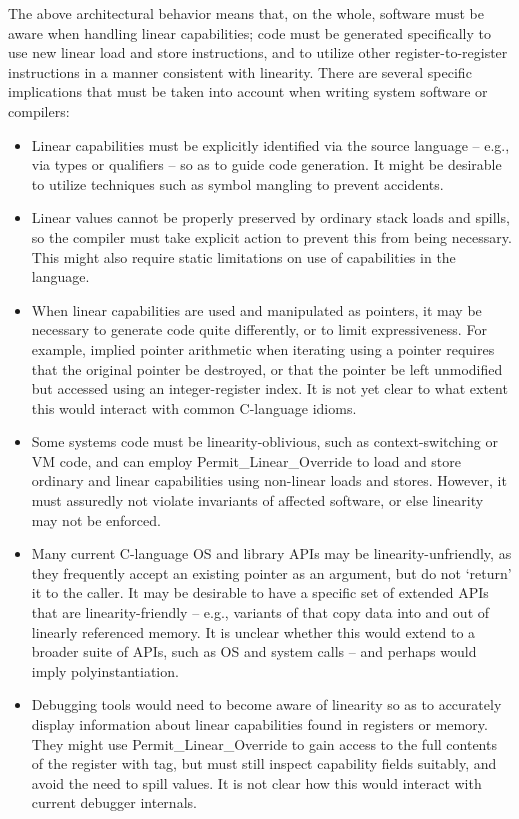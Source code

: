 The above architectural behavior means that, on the whole, software must
be aware when handling linear capabilities; code must be generated
specifically to use new linear load and store instructions, and to utilize
other register-to-register instructions in a manner consistent with linearity.
There are several specific implications that must be taken into account
when writing system software or compilers:

\begin{itemize}
\item Linear capabilities must be explicitly identified via the source
  language -- e.g., via types or qualifiers -- so as to guide code generation.
  It might be desirable to utilize techniques such as symbol mangling to
  prevent accidents.

\item Linear values cannot be properly preserved by ordinary stack loads and
  spills, so the compiler must take explicit action to prevent this from being
  necessary.
  This might also require static limitations on use of capabilities in the
  language.

\item When linear capabilities are used and manipulated as pointers, it may be
  necessary to generate code quite differently, or to limit expressiveness.
  For example, implied pointer arithmetic when iterating using a pointer
  requires that the original pointer be destroyed, or that the pointer be
  left unmodified but accessed using an integer-register index.
  It is not yet clear to what extent this would interact with common C-language
  idioms.

\item Some systems code must be linearity-oblivious, such as context-switching
  or VM code, and can employ Permit\_Linear\_Override to load and store
  ordinary and linear capabilities using non-linear loads and stores.
  However, it must assuredly not violate invariants of affected software, or
  else linearity may not be enforced.

\item Many current C-language OS and library APIs may be linearity-unfriendly,
  as they frequently accept an existing pointer as an argument, but do not
  `return' it to the caller.
  It may be desirable to have a specific set of extended APIs that are
  linearity-friendly -- e.g., variants of  that copy data into
  and out of linearly referenced memory.
  It is unclear
  whether this would extend to a broader suite of APIs, such as OS 
  and  system calls --  and perhaps would imply polyinstantiation.

\item Debugging tools would need to become aware of linearity so as to
  accurately display information about linear capabilities found in registers
  or memory.
  They might use Permit\_Linear\_Override to gain access to the full contents
  of the register with tag, but must still inspect capability fields suitably,
  and avoid the need to spill values.
  It is not clear how this would interact with current debugger internals.
\end{itemize}

